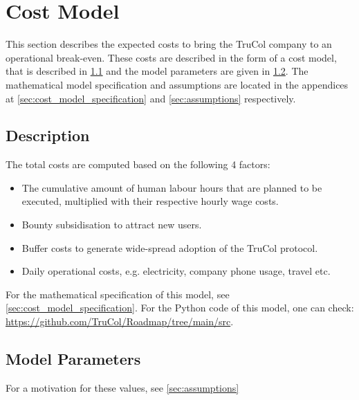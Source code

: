 \section{Cost Model}\label{sec:cost_model}
\noindent This section describes the expected costs to bring the TruCol company to an operational break-even. These costs are described in the form of a cost model, that is described in \cref{subsec:model_description} and the model parameters are given in \cref{subsec:model_parameters}. The mathematical model specification and assumptions are located in the appendices at \cref{sec:cost_model_specification} and \cref{sec:assumptions} respectively.

\subsection{Description}\label{subsec:model_description}
\noindent The total costs are computed based on the following 4 factors:
\begin{itemize}
	\item The cumulative amount of human labour hours that are planned to be executed, multiplied with their respective hourly wage costs.
	\item Bounty subsidisation to attract new users.
	\item Buffer costs to generate wide-spread adoption of the TruCol protocol.
    \item Daily operational costs, e.g. electricity, company phone usage, travel etc.
\end{itemize}
\noindent For the mathematical specification of this model, see \cref{sec:cost_model_specification}. For the Python code of this model, one can check: \url{https://github.com/TruCol/Roadmap/tree/main/src}.

\subsection{Model Parameters}\label{subsec:model_parameters}

\ifx\homepath\overleafhome
\else
\fi
\noindent For a motivation for these values, see \cref{sec:assumptions}
